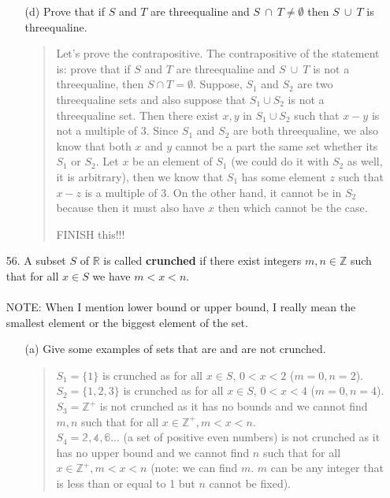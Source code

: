 \documentclass[12pt, a4paper]{article}                      %
\begin{document}
\begin{itemize}
\begin{itemize}
\item[]

\item[(d)]
Prove that if $S$ and $T$ are threequaline and $S \ \cap \ T \neq \emptyset$ then $S \ \cup \ T$ is threequaline.
\begin{quote}
Let's prove the contrapositive. The contrapositive of the statement is:
prove that if $S$ and $T$ are threequaline and $S \ \cup \ T$ is not a threequaline, then  $S \cap T = \emptyset$. Suppose, $S_1$ and $S_2$ are two threequaline sets and also suppose that $S_1 \cup S_2$ is not a threequaline set. Then there exist $x, y$ in $S_1 \cup S_2$ such that $x - y$ is not a multiple of 3. Since $S_1$ and $S_2$ are both threequaline, we also know that both $x$ and $y$ cannot be a part the same set whether its $S_1$ or $S_2$. Let $x$ be an element of $S_1$ (we could do it with $S_2$ as well, it is arbitrary), then we know that $S_1$ has some element $z$ such that $x - z$ is a multiple of 3. On the other hand, it cannot be in $S_2$ because then it must also have $x$ then which cannot be the case.

FINISH this!!!
\end{quote}
\end{itemize}

\item[]
\item[]

\item[56.]
A subset $S$ of $\mathbb{R}$ is called \textbf{crunched} if there exist integers $m, n \in \mathbb{Z}$ such that for all $x \in S$ we have $m < x < n$.\\\\
NOTE: When I mention lower bound or upper bound, I really mean the smallest element or the biggest element of the set.
\begin{itemize}
\item[]

\item[(a)]
Give some examples of sets that are and are not crunched.
\begin{quote}
$S_1 = \{1\}$ is crunched as for all $x \in S$, $0 < x < 2$ ($m = 0, n = 2$).\\
$S_2 = \{1, 2, 3\}$ is crunched as for all $x \in S$, $0 < x < 4$ ($m = 0, n = 4$).\\
$S_3 = \mathbb{Z^+}$ is not crunched as it has no bounds and we cannot find $m, n$ such that for all $x \in \mathbb{Z^+}, m< x < n$.\\
$S_4 = \mathbb{2,4,6 ...}$ (a set of positive even numbers) is not crunched as it has no upper bound and we cannot find $n$ such that for all $x \in \mathbb{Z^+}, m< x < n$ (note: we can find $m$. $m$ can be any integer that is less than or equal to 1 but $n$ cannot be fixed).
\end{quote}


\end{itemize}
\end{itemize}
\end{document}

